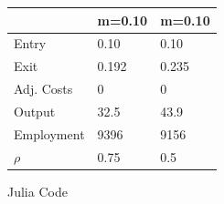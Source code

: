 \documentclass[12pt, letterpaper, parskip = full]{article}
\begin{document}
  \begin{table}[]
\begin{tabular}{|l|l|l|}
\hline
           & m=0.10 & m=0.10 \\ \hline
Entry      & 0.10   & 0.10   \\ \hline
Exit       & 0.192  & 0.235  \\ \hline
Adj. Costs & 0      & 0      \\ \hline
Output     & 32.5   & 43.9   \\ \hline
Employment & 9396   & 9156   \\ \hline
$\rho$        & 0.75   & 0.5    \\ \hline
\end{tabular}
\end{table}

\newpage

\appendix

Julia Code
\end{document}
